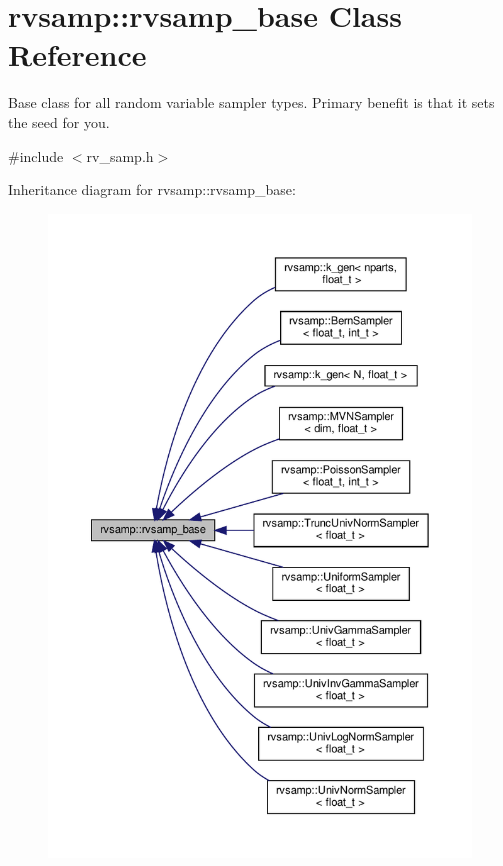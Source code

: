 \hypertarget{classrvsamp_1_1rvsamp__base}{}\section{rvsamp\+:\+:rvsamp\+\_\+base Class Reference}
\label{classrvsamp_1_1rvsamp__base}


Base class for all random variable sampler types. Primary benefit is that it sets the seed for you.  




{\ttfamily \#include $<$rv\+\_\+samp.\+h$>$}



Inheritance diagram for rvsamp\+:\+:rvsamp\+\_\+base\+:
\nopagebreak
\begin{figure}[H]
\begin{center}
\leavevmode
\includegraphics[width=350pt]{classrvsamp_1_1rvsamp__base__inherit__graph}
\end{center}
\end{figure}
